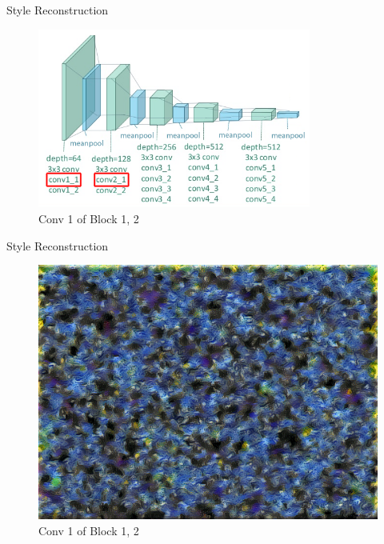 \documentclass{beamer}
\begin{document}
\begin{frame}{Style Reconstruction}
\begin{figure}[ht]
\centering
\includegraphics[width=0.8\textwidth]{img/vgg19/style/block2_conv1}
\caption*{Conv 1 of Block 1, 2}
\end{figure}
\end{frame}
\begin{frame}{Style Reconstruction}
\begin{figure}[ht]
\centering
\includegraphics[width=.8\textwidth]{img/style/block2_conv1}
\caption*{Conv 1 of Block 1, 2}
\end{figure}
\end{frame}
\end{document}

